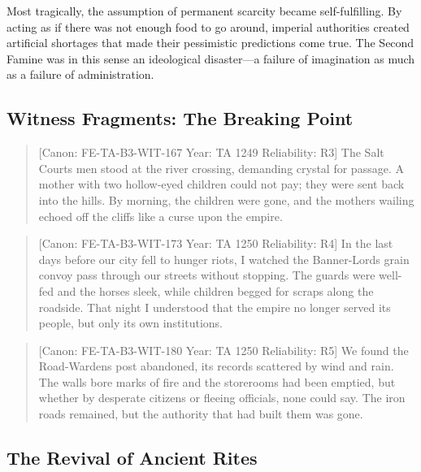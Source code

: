 Most tragically, the assumption of permanent scarcity became
self-fulfilling. By acting as if there was not enough food to go around,
imperial authorities created artificial shortages that made their
pessimistic predictions come true. The Second Famine was in this sense
an ideological disaster---a failure of imagination as much as a failure
of administration.

\subsection{Witness Fragments: The Breaking
Point}\label{witness-fragments-the-breaking-point}

\begin{quote}
{[}Canon: FE-TA-B3-WIT-167 \textbar{} Year: TA 1249 \textbar{}
Reliability: R3{]} The Salt Court\textquotesingle s men stood at the
river crossing, demanding crystal for passage. A mother with two
hollow-eyed children could not pay; they were sent back into the hills.
By morning, the children were gone, and the mother\textquotesingle s
wailing echoed off the cliffs like a curse upon the empire.
\end{quote}

\begin{quote}
{[}Canon: FE-TA-B3-WIT-173 \textbar{} Year: TA 1250 \textbar{}
Reliability: R4{]} In the last days before our city fell to hunger
riots, I watched the Banner-Lord\textquotesingle s grain convoy pass
through our streets without stopping. The guards were well-fed and the
horses sleek, while children begged for scraps along the roadside. That
night I understood that the empire no longer served its people, but only
its own institutions.
\end{quote}

\begin{quote}
{[}Canon: FE-TA-B3-WIT-180 \textbar{} Year: TA 1250 \textbar{}
Reliability: R5{]} We found the Road-Warden\textquotesingle s post
abandoned, its records scattered by wind and rain. The walls bore marks
of fire and the storerooms had been emptied, but whether by desperate
citizens or fleeing officials, none could say. The iron roads remained,
but the authority that had built them was gone.
\end{quote}

\subsection{The Revival of Ancient
Rites}\label{the-revival-of-ancient-rites}

